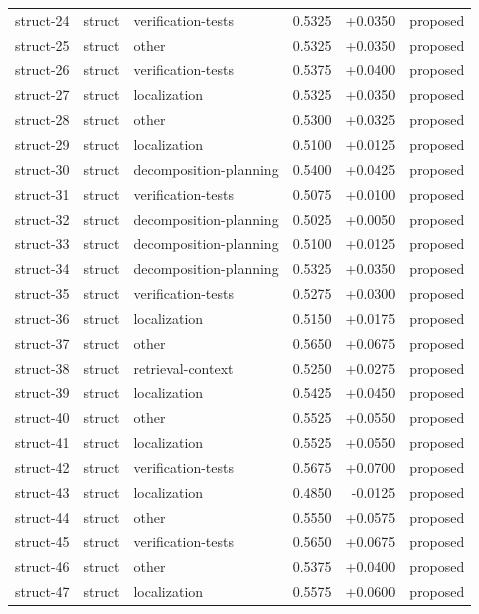 \begin{center}
\begin{longtable}{llp{5.2cm}rrl}
struct-24 & struct & verification-tests & 0.5325 & +0.0350 & proposed \\
struct-25 & struct & other & 0.5325 & +0.0350 & proposed \\
struct-26 & struct & verification-tests & 0.5375 & +0.0400 & proposed \\
struct-27 & struct & localization & 0.5325 & +0.0350 & proposed \\
struct-28 & struct & other & 0.5300 & +0.0325 & proposed \\
struct-29 & struct & localization & 0.5100 & +0.0125 & proposed \\
struct-30 & struct & decomposition-planning & 0.5400 & +0.0425 & proposed \\
struct-31 & struct & verification-tests & 0.5075 & +0.0100 & proposed \\
struct-32 & struct & decomposition-planning & 0.5025 & +0.0050 & proposed \\
struct-33 & struct & decomposition-planning & 0.5100 & +0.0125 & proposed \\
struct-34 & struct & decomposition-planning & 0.5325 & +0.0350 & proposed \\
struct-35 & struct & verification-tests & 0.5275 & +0.0300 & proposed \\
struct-36 & struct & localization & 0.5150 & +0.0175 & proposed \\
struct-37 & struct & other & 0.5650 & +0.0675 & proposed \\
struct-38 & struct & retrieval-context & 0.5250 & +0.0275 & proposed \\
struct-39 & struct & localization & 0.5425 & +0.0450 & proposed \\
struct-40 & struct & other & 0.5525 & +0.0550 & proposed \\
struct-41 & struct & localization & 0.5525 & +0.0550 & proposed \\
struct-42 & struct & verification-tests & 0.5675 & +0.0700 & proposed \\
struct-43 & struct & localization & 0.4850 & -0.0125 & proposed \\
struct-44 & struct & other & 0.5550 & +0.0575 & proposed \\
struct-45 & struct & verification-tests & 0.5650 & +0.0675 & proposed \\
struct-46 & struct & other & 0.5375 & +0.0400 & proposed \\
struct-47 & struct & localization & 0.5575 & +0.0600 & proposed \\

\end{longtable}
\end{center}
